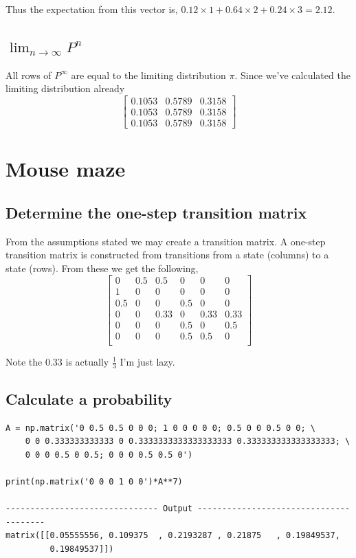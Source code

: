 \documentclass{article}
\begin{document}
Thus the expectation from this vector is,
$0.12 \times 1 + 0.64 \times 2 + 0.24 \times 3 = 2.12$.

\subsection{$\lim_{n \to \infty} P^n$}
All rows of $P^\infty$ are equal to the limiting distribution $\pi$.
Since we've calculated the limiting distribution already
\[
    \begin{bmatrix}
        0.1053 & 0.5789 & 0.3158 \\
        0.1053 & 0.5789 & 0.3158 \\
        0.1053 & 0.5789 & 0.3158
    \end{bmatrix}
\]

\section{Mouse maze}
\subsection{Determine the one-step transition matrix}
From the assumptions stated we may create a transition matrix.
A one-step transition matrix is constructed from transitions
from a state (columns) to a state (rows). From these we get the following,
\[
    \begin{bmatrix}
        0 & 0.5 & 0.5 & 0 & 0 & 0 \\
        1 & 0 & 0 & 0 & 0 & 0 \\
        0.5 & 0 & 0 & 0.5 & 0 & 0 \\
        0 & 0 & 0.33 & 0 & 0.33 & 0.33 \\
        0 & 0 & 0 & 0.5 & 0 & 0.5 \\
        0 & 0 & 0 & 0.5 & 0.5 & 0 \\
    \end{bmatrix}
\]

Note the $0.33$ is actually $\frac{1}{3}$ I'm just lazy.

\subsection{Calculate a probability}
\begin{verbatim}
A = np.matrix('0 0.5 0.5 0 0 0; 1 0 0 0 0 0; 0.5 0 0 0.5 0 0; \
    0 0 0.333333333333 0 0.3333333333333333333 0.333333333333333333; \
    0 0 0 0.5 0 0.5; 0 0 0 0.5 0.5 0')

print(np.matrix('0 0 0 1 0 0')*A**7)

------------------------------- Output ---------------------------------------
matrix([[0.05555556, 0.109375  , 0.2193287 , 0.21875   , 0.19849537,
         0.19849537]])
\end{verbatim}
\end{document}
